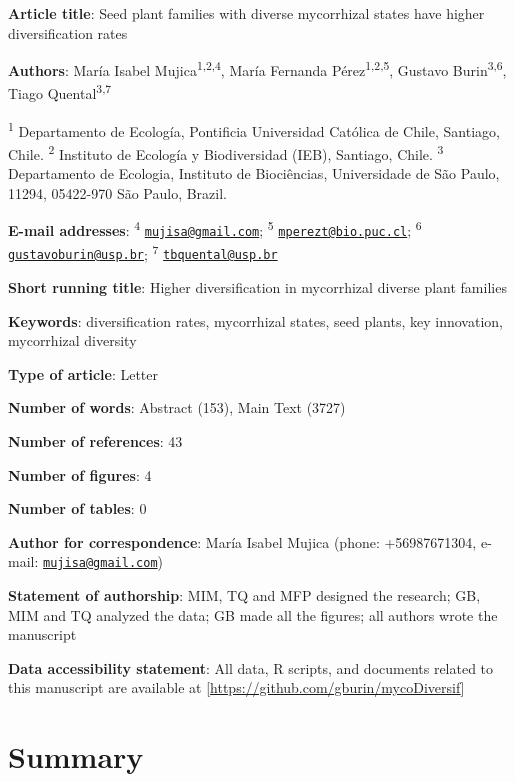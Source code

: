 \documentclass[12pt,]{article}
\title{}
\author{}
\date{}
\begin{document}
\textbf{Article title}: Seed plant families with diverse mycorrhizal
states have higher diversification rates

\textbf{Authors}: María Isabel Mujica\textsuperscript{1,2,4}, María
Fernanda Pérez\textsuperscript{1,2,5}, Gustavo
Burin\textsuperscript{3,6}, Tiago Quental\textsuperscript{3,7}

\textsuperscript{1} Departamento de Ecología, Pontificia Universidad
Católica de Chile, Santiago, Chile. \textsuperscript{2} Instituto de
Ecología y Biodiversidad (IEB), Santiago, Chile. \textsuperscript{3}
Departamento de Ecologia, Instituto de Biociências, Universidade de São
Paulo, 11294, 05422-970 São Paulo, Brazil.

\textbf{E-mail addresses}: \textsuperscript{4}
\href{mailto:mujisa@gmail.com}{\nolinkurl{mujisa@gmail.com}};
\textsuperscript{5}
\href{mailto:mperezt@bio.puc.cl}{\nolinkurl{mperezt@bio.puc.cl}};
\textsuperscript{6}
\href{mailto:gustavoburin@usp.br}{\nolinkurl{gustavoburin@usp.br}};
\textsuperscript{7}
\href{mailto:tbquental@usp.br}{\nolinkurl{tbquental@usp.br}}

\textbf{Short running title}: Higher diversification in mycorrhizal
diverse plant families

\textbf{Keywords}: diversification rates, mycorrhizal states, seed
plants, key innovation, mycorrhizal diversity

\textbf{Type of article}: Letter

\textbf{Number of words}: Abstract (153), Main Text (3727)

\textbf{Number of references}: 43

\textbf{Number of figures}: 4

\textbf{Number of tables}: 0

\textbf{Author for correspondence}: María Isabel Mujica (phone:
+56987671304, e-mail:
\href{mailto:mujisa@gmail.com}{\nolinkurl{mujisa@gmail.com}})

\textbf{Statement of authorship}: MIM, TQ and MFP designed the research;
GB, MIM and TQ analyzed the data; GB made all the figures; all authors
wrote the manuscript

\textbf{Data accessibility statement}: All data, R scripts, and
documents related to this manuscript are available at
{[}\url{https://github.com/gburin/mycoDiversif}{]}

\pagebreak

\hypertarget{summary}{%
\section{Summary}\label{summary}}
\end{document}
